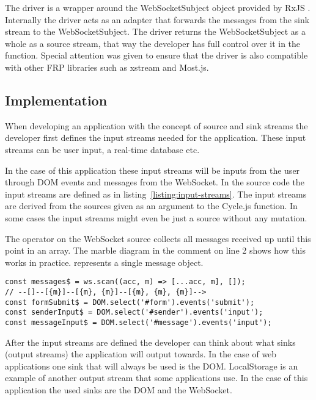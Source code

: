 The driver is a wrapper around the WebSocketSubject object provided by RxJS \cite{ws-subject}. Internally the driver acts as an adapter that forwards the messages from the sink stream to the WebSocketSubject. The driver returns the WebSocketSubject as a whole as a source stream, that way the developer has full control over it in the  function. Special attention was given to ensure that the driver is also compatible with other FRP libraries such as xstream and Most.js.

\subsection{Implementation}

When developing an application with the concept of source and sink streams the developer first defines the input streams needed for the application. These input streams can be user input, a real-time database etc.

In the case of this application these input streams will be inputs from the user through DOM events and messages from the WebSocket. In the source code the input streams are defined as in listing~\ref{listing:input-streams}. The input streams are derived from the sources given as an argument to the Cycle.js  function. In some cases the input streams might even be just a source without any mutation.

The  operator on the WebSocket source collects all messages received up until this point in an array. The marble diagram in the comment on line 2 shows how this works in practice.  represents a single message object.

\begin{lstlisting}[caption=Definition and instantiation of the input streams,label=listing:input-streams]
const messages$ = ws.scan((acc, m) => [...acc, m], []);
// --[]--[{m}]--[{m}, {m}]--[{m}, {m}, {m}]-->
const formSubmit$ = DOM.select('#form').events('submit');
const senderInput$ = DOM.select('#sender').events('input');
const messageInput$ = DOM.select('#message').events('input');
\end{lstlisting}

After the input streams are defined the developer can think about what sinks (output streams) the application will output towards. In the case of web applications one sink that will always be used is the DOM. LocalStorage is an example of another output stream that some applications use. In the case of this application the used sinks are the DOM and the WebSocket.

